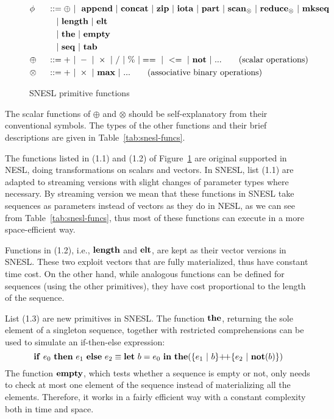 \begin{figure}[H]\large
\begin{alignat}{2} 
&\phi && ::= \oplus \ | \ \ \mathbf{append} \ | \ \mathbf{concat} \ | \ \mathbf{zip} \ | \ \mathbf{iota}  \ | \ \mathbf{part}  \ | \ \mathbf{scan}_{\otimes} \ | \ \mathbf{reduce}_{\otimes} \ | \ \mathbf{mkseq} \\
&   && \quad | \ \mathbf{length} \ | \ \mathbf{elt} \\
&   && \quad | \ \mathbf{the}  \ | \ \mathbf{empty} \\
&   && \quad | \ \mathbf{seq} \ | \ \mathbf{tab} \\
& \oplus  \ && :: = + \ | \ - \ | \ \times \ |  \  / \ | \ \% \ | ==  \ |\ <=  \ | \ \mathbf{not} \ | \ ... \tag{scalar operations} \\
& \otimes \ && :: = + \ | \ \times  \ | \ \mathbf{max} \ | \ ...  \tag{associative binary operations}
\end{alignat}
\caption{SNESL primitive functions \label{fig-snesl-func}}
\end{figure}

The scalar functions of $\oplus$ and $\otimes$ should be self-explanatory from their conventional symbols. 
The types of the other functions and their brief descriptions are given in Table~\ref{tab:snesl-funcs}.

The functions listed in (1.1) and (1.2) of Figure~\ref{fig-snesl-func} are original supported in NESL, doing transformations on scalars and vectors.
In SNESL, list (1.1) are adapted to streaming versions with slight changes of parameter types where necessary.
By streaming version we mean that these functions in SNESL take sequences as parameters instead of vectors as they do in NESL, as we can see from Table~\ref{tab:snesl-funcs}, thus most of these functions can execute in a more space-efficient way.  

Functions in (1.2), i.e., $\mathbf{length}$ and $\mathbf{elt}$, are kept as their vector versions in SNESL. 
These two exploit vectors that are fully materialized, thus have constant time cost.
On the other hand, while analogous functions can be defined for sequences (using the other primitives), they have cost proportional to the length of the sequence.

List (1.3) are new primitives in SNESL.  
The function $\mathbf{the}$, returning the sole element of a singleton sequence, together with restricted comprehensions can be used to simulate an if-then-else expression:
$$\*{if} \ e_0 \ \*{then} \ e_1 \ \*{else} \ e_2 \equiv \Let{b}{e_0}{ \*{the}(\{e_1 \ | \ b \} {\++} \{e_2 \ | \ \*{not}(b)\})} $$
The function $\mathbf{empty}$, which tests whether a sequence is empty or not, only needs to check at most one element of the sequence instead of materializing all the elements. Therefore, it works in a fairly efficient way with a constant complexity both in time and space.

